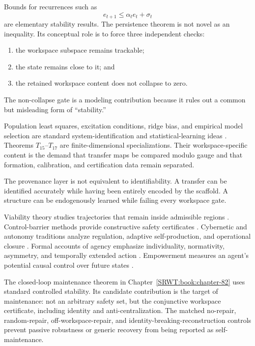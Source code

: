 Bounds for recurrences such as
\[
e_{t+1}\leq\alpha_t e_t+\sigma_t
\]
are elementary stability results. The persistence theorem is not novel as an
inequality. Its conceptual role is to force three independent checks:
\begin{enumerate}
\item the workspace subspace remains trackable;
\item the state remains close to it; and
\item the retained workspace content does not collapse to zero.
\end{enumerate}
The non-collapse gate is a modeling contribution because it rules out a common
but misleading form of ``stability.''


Population least squares, excitation conditions, ridge bias, and empirical
model selection are standard system-identification and statistical-learning
ideas \cite{SRWT:Ljung1999}. Theorems \(T_{15}\)--\(T_{17}\) are finite-dimensional
specializations. Their workspace-specific content is the demand that transfer
maps be compared modulo gauge and that formation, calibration, and
certification data remain separated.

The provenance layer is not equivalent to identifiability. A transfer can be
identified accurately while having been entirely encoded by the scaffold. A
structure can be endogenously learned while failing every workspace gate.


Viability theory studies trajectories that remain inside admissible regions
\cite{SRWT:Aubin1991}. Control-barrier methods provide constructive safety
certificates \cite{SRWT:AmesEtAl2017}. Cybernetic and autonomy traditions analyze
regulation, adaptive self-production, and operational closure
\cite{SRWT:Ashby1956,SRWT:MaturanaVarela1980,SRWT:DiPaolo2005}. Formal accounts of agency
emphasize individuality, normativity, asymmetry, and temporally extended action
\cite{SRWT:BarandiaranEtAl2009}. Empowerment measures an agent's potential causal
control over future states \cite{SRWT:KlyubinEtAl2005}.

The closed-loop maintenance theorem in Chapter~\ref{SRWT:book:chapter-82} uses standard controlled
stability. Its candidate contribution is the target of maintenance: not an
arbitrary safety set, but the conjunctive workspace certificate, including
identity and anti-centralization. The matched no-repair, random-repair,
off-workspace-repair, and identity-breaking-reconstruction controls prevent
passive robustness or generic recovery from being reported as self-maintenance.

